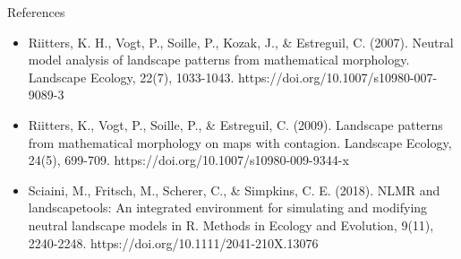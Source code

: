 \documentclass[aspectratio=169]{beamer}
\begin{document}
\begin{frame}[allowframebreaks]{References}
\begin{itemize}
    \item Riitters, K. H., Vogt, P., Soille, P., Kozak, J., \& Estreguil, C. (2007). Neutral model analysis of landscape patterns from mathematical morphology. Landscape Ecology, 22(7), 1033-1043. https://doi.org/10.1007/s10980-007-9089-3

    \item Riitters, K., Vogt, P., Soille, P., \& Estreguil, C. (2009). Landscape patterns from mathematical morphology on maps with contagion. Landscape Ecology, 24(5), 699-709. https://doi.org/10.1007/s10980-009-9344-x

    \item Sciaini, M., Fritsch, M., Scherer, C., \& Simpkins, C. E. (2018). NLMR and landscapetools: An integrated environment for simulating and modifying neutral landscape models in R. Methods in Ecology and Evolution, 9(11), 2240-2248. https://doi.org/10.1111/2041-210X.13076


\end{itemize}  
\end{frame}

\end{document}
